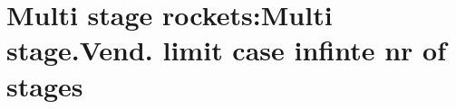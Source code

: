\section{ Multi stage rockets:Multi stage.Vend. limit case infinte nr of stages }\label{sec:q3}    
